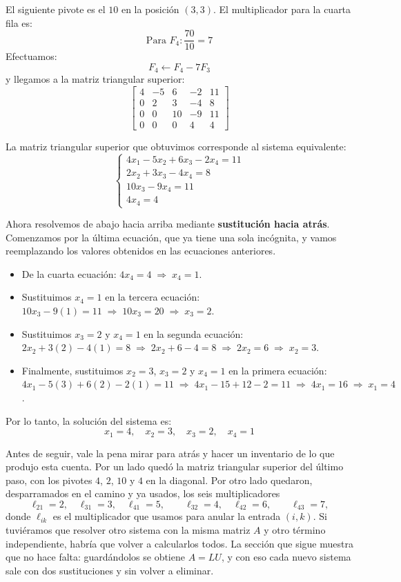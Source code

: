 El siguiente pivote es el \(10\) en la posición \((3,3)\). El multiplicador para la cuarta fila es:
\[
\text{Para } F_4 : \frac{70}{10} = 7
\]
Efectuamos:
\[
F_4 \leftarrow F_4 - 7F_3
\]
y llegamos a la matriz triangular superior:
\[
\left[\begin{array}{cccc|c}
4 & -5 &  6 & -2 & 11 \\
0 &  2 &  3 & -4 &  8 \\
0 &  0 & 10 & -9 & 11 \\
0 &  0 &  0 &  4 &  4
\end{array}\right]
\]

La matriz triangular superior que obtuvimos corresponde al sistema equivalente:
\[
\begin{cases}
4x_1 - 5x_2 + 6x_3 - 2x_4 = 11 \\
2x_2 + 3x_3 - 4x_4 = 8 \\
10x_3 - 9x_4 = 11 \\
4x_4 = 4
\end{cases}
\]

Ahora resolvemos de abajo hacia arriba mediante \textbf{sustitución hacia atrás}. Comenzamos por la última ecuación, que ya tiene una sola incógnita, y vamos reemplazando los valores obtenidos en las ecuaciones anteriores.

\begin{itemize}
\item De la cuarta ecuación: \(4x_4 = 4 \;\Longrightarrow\; x_4 = 1\).
\item Sustituimos \(x_4 = 1\) en la tercera ecuación:
  \(10x_3 - 9(1) = 11 \;\Longrightarrow\; 10x_3 = 20 \;\Longrightarrow\; x_3 = 2\).
\item Sustituimos \(x_3 = 2\) y \(x_4 = 1\) en la segunda ecuación:
  \(2x_2 + 3(2) - 4(1) = 8 \;\Longrightarrow\; 2x_2 + 6 - 4 = 8 \;\Longrightarrow\; 2x_2 = 6 \;\Longrightarrow\; x_2 = 3\).
\item Finalmente, sustituimos \(x_2 = 3\), \(x_3 = 2\) y \(x_4 = 1\) en la primera ecuación:
  \(4x_1 - 5(3) + 6(2) - 2(1) = 11 \;\Longrightarrow\; 4x_1 - 15 + 12 - 2 = 11 \;\Longrightarrow\; 4x_1 = 16 \;\Longrightarrow\; x_1 = 4\).
\end{itemize}

Por lo tanto, la solución del sistema es:
\[
\boxed{x_1 = 4,\quad x_2 = 3,\quad x_3 = 2,\quad x_4 = 1}
\]

\medskip
\noindent Antes de seguir, vale la pena mirar para atrás y hacer un inventario
de lo que produjo esta cuenta. Por un lado quedó la matriz triangular superior
del último paso, con los pivotes $4$, $2$, $10$ y $4$ en la diagonal. Por otro
lado quedaron, desparramados en el camino y ya usados, los seis multiplicadores
\[
\ell_{21}=2,\quad \ell_{31}=3,\quad \ell_{41}=5,\qquad
\ell_{32}=4,\quad \ell_{42}=6,\qquad \ell_{43}=7 ,
\]
donde $\ell_{ik}$ es el multiplicador que usamos para anular la entrada $(i,k)$.
Si tuviéramos que resolver otro sistema con la misma matriz $A$ y otro término
independiente, habría que volver a calcularlos todos. La sección que sigue
muestra que no hace falta: guardándolos se obtiene $A=LU$, y con eso cada nuevo
sistema sale con dos sustituciones y sin volver a eliminar.



